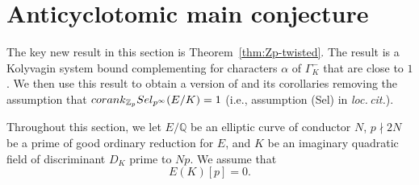 \documentclass[a4paper,10pt]{amsart}
\numberwithin{equation}{section}
\numberwithin{equation}{section}
\theoremstyle{plain}
\theoremstyle{definition}
\theoremstyle{definition}
\theoremstyle{plain}
\theoremstyle{plain}
\theoremstyle{plain}
\theoremstyle{plain}
\newcommand{\Z}{\mathbb{Z}}
\newcommand{\Q}{\mathbb{Q}}
\newcommand{\X}{\mathfrak{X}}
\DeclareMathOperator{\ch}{ch}
\newcommand{\rH}{\mathrm{H}}
\begin{document}


\section{Anticyclotomic main conjecture}\label{sec:anticyc}

The key new result in this section is Theorem~\ref{thm:Zp-twisted}. The result is a Kolyvagin system bound complementing \cite[Thm.~3.2.1]{eisenstein} for characters $\alpha$ of $\Gamma_K^-$ that are close to $1$. We then use this result to obtain a version of \cite[Thm.~C]{eisenstein} and its corollaries removing the assumption that ${\rm corank}_{\Z_p}{\rm Sel}_{p^\infty}(E/K)=1$ (i.e., assumption (Sel) in \emph{loc.\,cit.}).  

Throughout this section, we let $E/\Q$ be an elliptic curve of conductor $N$, $p\nmid 2N$ be a prime of good ordinary reduction for $E$, and $K$ be an imaginary quadratic field of discriminant $D_K$ prime to $Np$. We assume that
\begin{equation}\label{eq:h1}
E(K)[p]=0.\tag{h1}
\end{equation}
\end{document}
